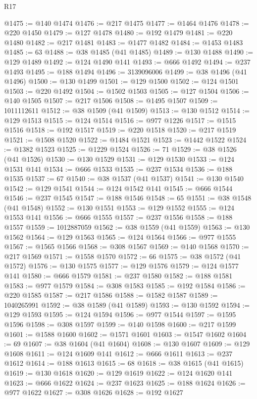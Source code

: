 \begin{lexlean}{R17}
\begin{coremodule}
@1475 := @140 @1474
@1476 := @217 @1475
@1477 := @1464 @1476
@1478 := @220 @1450
@1479 := @127 @1478
@1480 := @192 @1479
@1481 := @220 @1480
@1482 := @217 @1481
@1483 := @1477 @1482
@1484 := @1453 @1483
@1485 := 63
@1488 := @38 @1485 (@41 @1485)
@1489 := @130 @1488
@1490 := @129 @1489
@1492 := @124 @1490 @141
@1493 := @666 @1492
@1494 := @237 @1493
@1495 := @188 @1494
@1496 := 3139096006
@1499 := @38 @1496 (@41 @1496)
@1500 := @130 @1499
@1501 := @129 @1500
@1502 := @124 @1501
@1503 := @220 @1492
@1504 := @1502 @1503
@1505 := @127 @1504
@1506 := @140 @1505
@1507 := @217 @1506
@1508 := @1495 @1507
@1509 := 1011112611
@1512 := @38 @1509 (@41 @1509)
@1513 := @130 @1512
@1514 := @129 @1513
@1515 := @124 @1514
@1516 := @977 @1226
@1517 := @1515 @1516
@1518 := @192 @1517
@1519 := @220 @1518
@1520 := @217 @1519
@1521 := @1508 @1520
@1522 := @1484 @1521
@1523 := @1442 @1522
@1524 := @1382 @1523
@1525 := @1229 @1524
@1526 := 71
@1529 := @38 @1526 (@41 @1526)
@1530 := @130 @1529
@1531 := @129 @1530
@1533 := @124 @1531 @141
@1534 := @666 @1533
@1535 := @237 @1534
@1536 := @188 @1535
@1537 := 67
@1540 := @38 @1537 (@41 @1537)
@1541 := @130 @1540
@1542 := @129 @1541
@1544 := @124 @1542 @141
@1545 := @666 @1544
@1546 := @237 @1545
@1547 := @188 @1546
@1548 := 65
@1551 := @38 @1548 (@41 @1548)
@1552 := @130 @1551
@1553 := @129 @1552
@1555 := @124 @1553 @141
@1556 := @666 @1555
@1557 := @237 @1556
@1558 := @188 @1557
@1559 := 1012887059
@1562 := @38 @1559 (@41 @1559)
@1563 := @130 @1562
@1564 := @129 @1563
@1565 := @124 @1564
@1566 := @977 @1555
@1567 := @1565 @1566
@1568 := @308 @1567
@1569 := @140 @1568
@1570 := @217 @1569
@1571 := @1558 @1570
@1572 := 66
@1575 := @38 @1572 (@41 @1572)
@1576 := @130 @1575
@1577 := @129 @1576
@1579 := @124 @1577 @141
@1580 := @666 @1579
@1581 := @237 @1580
@1582 := @188 @1581
@1583 := @977 @1579
@1584 := @308 @1583
@1585 := @192 @1584
@1586 := @220 @1585
@1587 := @217 @1586
@1588 := @1582 @1587
@1589 := 1040265991
@1592 := @38 @1589 (@41 @1589)
@1593 := @130 @1592
@1594 := @129 @1593
@1595 := @124 @1594
@1596 := @977 @1544
@1597 := @1595 @1596
@1598 := @308 @1597
@1599 := @140 @1598
@1600 := @217 @1599
@1601 := @1588 @1600
@1602 := @1571 @1601
@1603 := @1547 @1602
@1604 := 69
@1607 := @38 @1604 (@41 @1604)
@1608 := @130 @1607
@1609 := @129 @1608
@1611 := @124 @1609 @141
@1612 := @666 @1611
@1613 := @237 @1612
@1614 := @188 @1613
@1615 := 68
@1618 := @38 @1615 (@41 @1615)
@1619 := @130 @1618
@1620 := @129 @1619
@1622 := @124 @1620 @141
@1623 := @666 @1622
@1624 := @237 @1623
@1625 := @188 @1624
@1626 := @977 @1622
@1627 := @308 @1626
@1628 := @192 @1627

\end{coremodule}
\end{lexlean}
